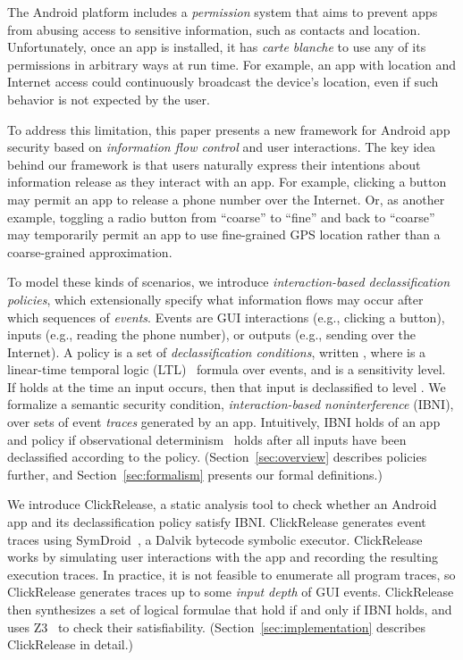 \documentclass{llncs}
\newcommand{\toolname}{ClickRelease\xspace}
\begin{document}
The Android platform includes a \emph{permission} system that aims to
prevent apps from abusing access to sensitive information, such as
contacts and location. Unfortunately, once an app is installed, it has
\emph{carte blanche} to use any of its permissions in arbitrary ways
at run time. For example, an app with location and Internet access
could continuously broadcast the device's location, even if such
behavior is not expected by the user.


To address this limitation, this paper presents a new framework for
Android app security based on \emph{information flow control}
\cite{Denning:1975} and user interactions.  The key idea behind our framework
is that users naturally express their intentions about information
release as they interact with an app.  For example,
clicking a button may permit an app to release a phone number over the
Internet. Or, as another example,
toggling a radio button from ``coarse'' to ``fine'' and back to
  ``coarse'' may temporarily permit an app to use fine-grained GPS
  location rather than a coarse-grained approximation.

To model these kinds of scenarios, we introduce
\emph{interaction-based declassification policies}, which
extensionally specify what information flows may occur after which
sequences of \emph{events}.  Events are GUI interactions (e.g.,
clicking a button), inputs (e.g., reading
the phone number), or outputs (e.g., sending over the Internet).
A policy is a set of \emph{declassification conditions}, written
, where  is a linear-time temporal logic
(LTL)~\cite{Pnueli:1977} formula over events, and  is a sensitivity
level.  If  holds at the time an input occurs, then that input
is declassified to level . 
We formalize a semantic security condition,
\emph{interaction-based noninterference} (IBNI), over sets of event
\emph{traces} generated by an app.  Intuitively, IBNI holds of an app
and policy if observational
determinism~\cite{Zdancewic:03} holds after all inputs have been
declassified according to the policy. 
(Section~\ref{sec:overview}
describes policies further, and Section~\ref{sec:formalism} presents
our formal definitions.)

We introduce \toolname, a static analysis tool to check
whether an Android app and its declassification policy
satisfy IBNI.
\toolname generates event traces using SymDroid~\cite{Jeon:2012}, a
Dalvik bytecode symbolic executor.  \toolname
works by simulating user interactions with the app and recording the
resulting execution traces.
In practice, it is not feasible to
enumerate all program traces, so \toolname generates traces up to some
\emph{input depth} of  GUI events.  
\toolname{} then synthesizes a
set of logical formulae that hold if and only if IBNI holds, and uses
Z3~\cite{deMoura:2008} to check their satisfiability.
(Section~\ref{sec:implementation} describes \toolname in detail.)
\end{document}

